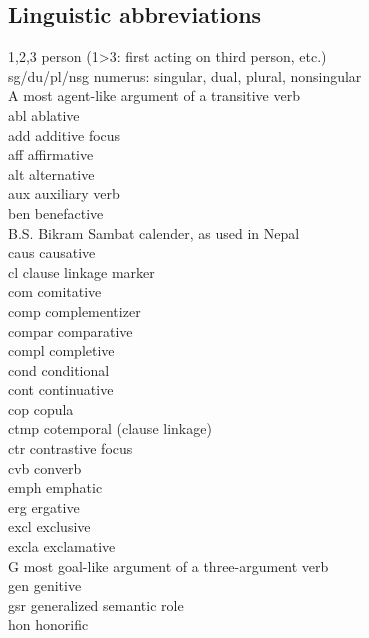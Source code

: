 \label{abbreviations}
\begin{refsection}

\section*{Linguistic abbreviations}
\begin{multicols}{2}\enlargethispage{2\baselineskip}
\setlength{\parindent}{0pt}
1,2,3 		 person (1>3: first acting on third person, etc.)\\
{\sc sg/du/pl/nsg} 		 numerus: singular, dual, plural, nonsingular\\
A		 most agent-like argument of a transitive verb\\
{\sc abl}  ablative\\
{\sc add} additive focus\\
{\sc aff}  affirmative\\
{\sc alt}  alternative\\
{\sc aux} auxiliary verb\\
{\sc ben}		 benefactive \\
{\sc B.S.}		 Bikram Sambat calender, as used in Nepal\\
{\sc caus}  causative\\
{\sc cl} clause linkage marker\\
{\sc com}  comitative\\
{\sc comp}  complementizer\\
{\sc compar}  comparative\\
{\sc compl} completive\\
{\sc cond}  conditional\\
{\sc cont} continuative\\
{\sc cop}  copula\\
{\sc ctmp} cotemporal (clause linkage)\\
{\sc ctr}  contrastive focus\\
{\sc cvb}  converb\\
{\sc emph}  emphatic\\
{\sc erg}  ergative \\
{\sc excl}  exclusive\\
{\sc excla} exclamative\\
G  most goal-like argument of a three-argument verb\\
{\sc gen}  genitive\\
{\sc gsr}  generalized semantic role\\
{\sc hon} honorific\\

\end{multicols}
\end{refsection}
